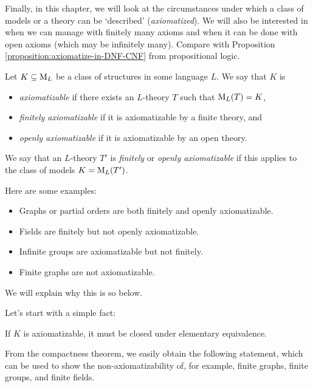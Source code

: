 Finally, in this chapter, we will look at the circumstances under which a class of models or a theory can be `described' (\emph{axiomatized}). We will also be interested in when we can manage with finitely many axioms and when it can be done with open axioms (which may be infinitely many). Compare with Proposition \ref{proposition:axiomatize-in-DNF-CNF} from propositional logic.

\begin{definition}[Axiomatizability]
Let $K \subseteq \operatorname{M}_L$ be a class of structures in some language $L$. We say that $K$ is
\begin{itemize}
    \item \emph{axiomatizable} if there exists an $L$-theory $T$ such that $\operatorname{M}_L(T)=K$,
    \item \emph{finitely axiomatizable} if it is axiomatizable by a finite theory, and
    \item \emph{openly axiomatizable} if it is axiomatizable by an open theory.
\end{itemize}
We say that an $L$-theory $T'$ is \emph{finitely} or \emph{openly axiomatizable} if this applies to the class of models $K=\operatorname{M}_L(T')$.
\end{definition}

\begin{example}
    Here are some examples:
    \begin{itemize}
        \item Graphs or partial orders are both finitely and openly axiomatizable.
        \item Fields are finitely but not openly axiomatizable.
        \item Infinite groups are axiomatizable but not finitely.
        \item Finite graphs are not axiomatizable.
    \end{itemize}
    We will explain why this is so below.
\end{example}

Let's start with a simple fact:

\begin{observation}
    If $K$ is axiomatizable, it must be closed under elementary equivalence.  
\end{observation}

From the compactness theorem, we easily obtain the following statement, which can be used to show the non-axiomatizability of, for example, finite graphs, finite groups, and finite fields.

